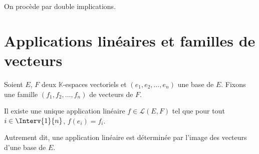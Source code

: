 \documentclass[a4paper,10pt]{report}
\begin{document}
\begin{Demonstration}{} On procède par double implications.
%
%
%
%

\vspace{6cm}
\end{Demonstration}

\section{Applications linéaires et familles de vecteurs}

\begin{Proposition}{} Soient $E$, $F$ deux $\mathbb{K}$-espaces vectoriels et $(e_1, e_2, \ldots, e_n)$ une base de $E$. Fixons une famille $(f_1, f_2, \ldots, f_n)$ de vecteurs de $F$. 

Il existe une unique application linéaire $f \in \mathcal{L}(E,F)$ tel que pour tout $i \in \Interv{1}{n}$, $f(e_i)=f_i$.

Autrement dit, une application linéaire est déterminée par l'image des vecteurs d'une base de $E$.
\end{Proposition}

%
\end{document}
